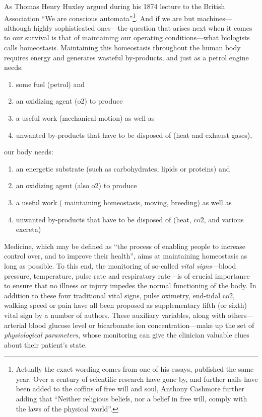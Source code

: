 As Thomas Henry Huxley argued during his 1874 lecture to the British Association\cite{huxley1874_nat} \enquote{We are conscious automata}\footnote{Actually the exact wording comes from one of his essays, published the same year\cite{huxley1874}. Over a century of scientific research have gone by, and further nails have been added to the coffins of free will and soul, Anthony Cashmore further adding that \enquote{Neither religious beliefs, nor a belief in free will, comply with the laws of the physical world}\cite{cashmore2010}.}. And if we are but machines---although highly sophisticated ones---the question that arises next when it comes to our survival is that of maintaining our operating conditions---what biologists calls homeostasis. Maintaining this homeostasis throughout the human body requires energy and generates wasteful by-products, and just as a petrol engine needs:
\begin{enumerate}
	\item some fuel (petrol) and
	\item an oxidizing agent (\gls{o2}) to produce
	\item a useful work (mechanical motion) as well as
	\item unwanted by-products that have to be disposed of (heat and exhaust gases),
\end{enumerate} 
our body needs:
\begin{enumerate}
	\item an energetic substrate (such as carbohydrates, lipids or proteins) and
	\item an oxidizing agent (also \gls{o2}) to produce
	\item a useful work (\eg{} maintaining homeostasis, moving, breeding) as well as
	\item unwanted by-products that have to be disposed of (heat, \gls{co2}, and various excreta)
\end{enumerate}

Medicine, which may be defined as \enquote{the process of enabling people to increase control over, and to improve their health}\cite{who_health_glossary_2021}, aims at maintaining homeostasis as long as possible. To this end, the monitoring of so-called \emph{vital signs}---blood pressure, temperature, pulse rate and respiratory rate\cite{lockwood2004}---is of crucial importance to ensure that no illness or injury impedes the normal functioning of the body. In addition to these four traditional vital signs, pulse oximetry\cite{callahan2008}, end-tidal \gls{co2}\cite{ahrens2004, hunter2014}, walking speed\cite{middleton2015} or pain\cite{morone2013} have all been proposed as supplementary fifth (or sixth) vital sign by a number of authors. These auxiliary variables, along with others---\eg{} arterial blood glucose level or bicarbonate ion concentration---make up the set of \emph{physiological parameters}, whose monitoring can give the clinician valuable clues about their patient's state.

